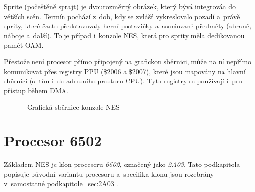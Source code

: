 \begin{definition}[Sprite]
	Sprite (počeštěně sprajt) je dvourozměrný obrázek, který bývá integrován do větších scén. Termín pochází z~dob, kdy se zvlášť vykreslovalo pozadí a~právě sprity, které často představovaly herní postavičky a~asociované předměty (zbraně, náboje a~další). To je případ i~konzole NES, která pro sprity měla dedikovanou paměť OAM.
\end{definition}

\begin{note}
	Přestože není procesor přímo připojený na grafickou sběrnici, může na ní nepřímo komunikovat přes registry PPU (\$2006 a \$2007), které jsou mapovány na hlavní sběrnici (a~tím i~do adresního prostoru CPU). Tyto registry se používají i~pro přístup během DMA.
\end{note}

\begin{figure}[ht!]
	\centering
	\caption{~Grafická sběrnice konzole NES}\label{fig:nes-grafickasbernice}
\end{figure}

\section{Procesor 6502}
Základem NES je klon procesoru \emph{6502}, označený jako \emph{2A03}. Tato podkapitola popisuje původní variantu procesoru a~specifika klonu jsou rozebrány v~samostatné podkapitole~\ref{sec:2A03}.


